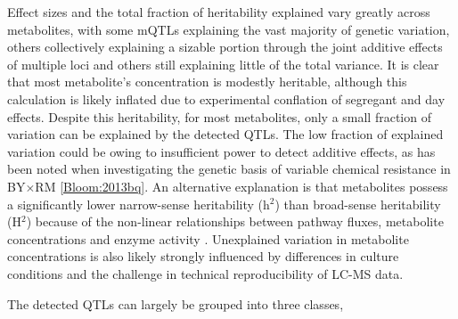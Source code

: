 Effect sizes and the total fraction of heritability explained vary greatly across metabolites, with some mQTLs explaining the vast majority of genetic variation, others collectively explaining a sizable portion through the joint additive effects of multiple loci and others still explaining little of the total variance.  It is clear that most metabolite's concentration is modestly heritable, although this calculation is likely inflated due to experimental conflation of segregant and day effects.  Despite this heritability, for most metabolites, only a small fraction of variation can be explained by the detected QTLs.  The low fraction of explained variation could be owing to insufficient power to detect additive effects, as has been noted when investigating the genetic basis of variable chemical resistance in BY$\times$RM \ref{Bloom:2013bq}.  An alternative explanation is that metabolites possess a significantly lower narrow-sense heritability (h$^{2}$) than broad-sense heritability (H$^{2}$) because of the non-linear relationships between pathway fluxes, metabolite concentrations and enzyme activity \cite{Kacser:1973fe, Rowe:2008ty}. Unexplained variation in metabolite concentrations is also likely strongly influenced by differences in culture conditions and the challenge in technical reproducibility of LC-MS data. 



The detected QTLs can largely be grouped into three classes, 


  





 




